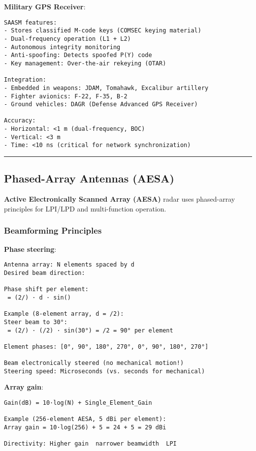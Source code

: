 \textbf{Military GPS Receiver}:

\begin{verbatim}
SAASM features:
- Stores classified M-code keys (COMSEC keying material)
- Dual-frequency operation (L1 + L2)
- Autonomous integrity monitoring
- Anti-spoofing: Detects spoofed P(Y) code
- Key management: Over-the-air rekeying (OTAR)

Integration:
- Embedded in weapons: JDAM, Tomahawk, Excalibur artillery
- Fighter avionics: F-22, F-35, B-2
- Ground vehicles: DAGR (Defense Advanced GPS Receiver)

Accuracy:
- Horizontal: <1 m (dual-frequency, BOC)
- Vertical: <3 m
- Time: <10 ns (critical for network synchronization)
\end{verbatim}

\begin{center}\rule{0.5\linewidth}{0.5pt}\end{center}

\subsection{\texorpdfstring{ Phased-Array Antennas
(AESA)}{ Phased-Array Antennas (AESA)}}\label{phased-array-antennas-aesa}

\textbf{Active Electronically Scanned Array (AESA)} radar uses
phased-array principles for LPI/LPD and multi-function operation.

\subsubsection{Beamforming Principles}\label{beamforming-principles}

\textbf{Phase steering}:

\begin{verbatim}
Antenna array: N elements spaced by d
Desired beam direction: 

Phase shift per element:
 = (2/) · d · sin()

Example (8-element array, d = /2):
Steer beam to 30°:
 = (2/) · (/2) · sin(30°) = /2 = 90° per element

Element phases: [0°, 90°, 180°, 270°, 0°, 90°, 180°, 270°]

Beam electronically steered (no mechanical motion!)
Steering speed: Microseconds (vs. seconds for mechanical)
\end{verbatim}

\textbf{Array gain}:

\begin{verbatim}
Gain(dB) = 10·log(N) + Single_Element_Gain

Example (256-element AESA, 5 dBi per element):
Array gain = 10·log(256) + 5 = 24 + 5 = 29 dBi

Directivity: Higher gain  narrower beamwidth  LPI
\end{verbatim}

